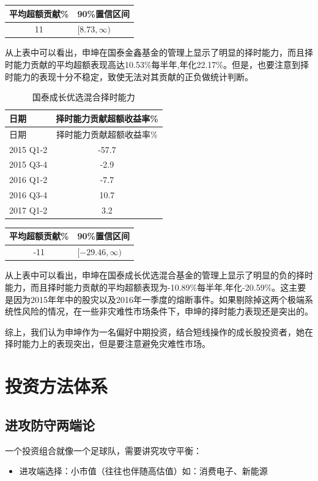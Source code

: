 \documentclass[hyperref,]{ctexart}
\providecommand{\tightlist}{%
  \setlength{\itemsep}{0pt}\setlength{\parskip}{0pt}}
\begin{document}
\begin{longtable}[]{@{}cl@{}}
\toprule
平均超额贡献\% & 90\%置信区间\tabularnewline
\midrule
\endhead
11 & \([8.73,\infty)\)\tabularnewline
\bottomrule
\end{longtable}

从上表中可以看出，申坤在国泰金鑫基金的管理上显示了明显的择时能力，而且择时能力贡献的平均超额表现高达10.53\%每半年,年化22.17\%。但是，也要注意到择时能力的表现十分不稳定，致使无法对其贡献的正负做统计判断。

\begin{longtable}[]{@{}lc@{}}
\caption{国泰成长优选混合择时能力}\tabularnewline
\toprule
日期 & 择时能力贡献超额收益率\%\tabularnewline
\midrule
\endfirsthead
\toprule
日期 & 择时能力贡献超额收益率\%\tabularnewline
\midrule
\endhead
2015 Q1-2 & -57.7\tabularnewline
2015 Q3-4 & -2.9\tabularnewline
2016 Q1-2 & -7.7\tabularnewline
2016 Q3-4 & 10.7\tabularnewline
2017 Q1-2 & 3.2\tabularnewline
\bottomrule
\end{longtable}

\begin{longtable}[]{@{}cl@{}}
\toprule
平均超额贡献\% & 90\%置信区间\tabularnewline
\midrule
\endhead
-11 & \([-29.46,\infty)\)\tabularnewline
\bottomrule
\end{longtable}

从上表中可以看出，申坤在国泰成长优选混合基金的管理上显示了明显的负的择时能力，而且择时能力贡献的平均超额表现为-10.89\%每半年,年化-20.59\%。这主要是因为2015年年中的股灾以及2016年一季度的熔断事件。如果剔除掉这两个极端系统性风险的情况，在一些非灾难性市场条件下，申坤的择时能力表现还是突出的。

综上，我们认为申坤作为一名偏好中期投资，结合短线操作的成长股投资者，她在择时能力上的表现突出，但是要注意避免灾难性市场。

\section{投资方法体系}

\subsection{进攻防守两端论}

一个投资组合就像一个足球队，需要讲究攻守平衡：

\begin{itemize}
\tightlist
\item
  进攻端选择：小市值（往往也伴随高估值）如：消费电子、新能源
\end{itemize}
\end{document}
